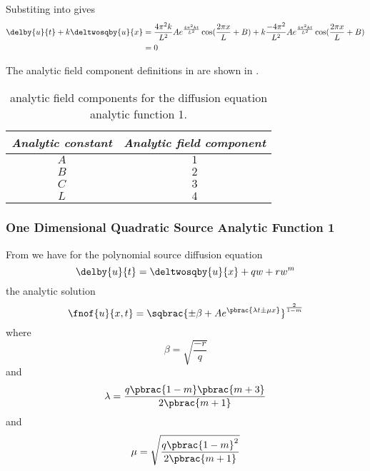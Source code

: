 Substiting  into  gives
\begin{align}
  \delby{u}{t}+k\deltwosqby{u}{x} &=
  \dfrac{4\pi^{2}k}{L^{2}}Ae^{\frac{4\pi^{2}kt}{L^{2}}}\cos(\frac{2\pi x}{L}
  + B) +
  k\dfrac{-4\pi^{2}}{L^{2}}Ae^{\frac{4\pi^{2}kt}{L^{2}}}\cos(\frac{2\pi x}{L}
  + B) \\
  &= 0
\end{align}

The analytic field component definitions in \OpenCMISS are shown in .

\begin{table}[htb] \centering
  \begin{tabular}{|c|c|} \hline
    \emph{Analytic constant} & \emph{Analytic field component} \\ \hline \hline
    $A$ & $1$ \\ 
    $B$ & $2$ \\
    $C$ & $3$ \\
    $L$ & $4$ \\ \hline
  \end{tabular}
  \caption{\OpenCMISS analytic field components for the \oned diffusion equation
    analytic function 1.}
  \label{tab:OpenCMISSAnalyticFieldDiffusionEquationOneDim1}
\end{table}

\subsubsection{One Dimensional Quadratic Source Analytic Function 1}

From  we have for
the \oned polynomial source diffusion equation
\begin{equation}
  \delby{u}{t}=\deltwosqby{u}{x}+qw+rw^{m}
\end{equation}
the analytic solution
\begin{equation}
  \fnof{u}{x,t}=\sqbrac{\pm\beta+Ae^{\pbrac{\lambda t \pm\mu x}}}^\frac{2}{1-m}
\end{equation}
where
\begin{equation}
  \beta=\sqrt{\dfrac{-r}{q}}
\end{equation}
and
\begin{equation}
  \lambda=\dfrac{q\pbrac{1-m}\pbrac{m+3}}{2\pbrac{m+1}}
\end{equation}
and 
\begin{equation}
  \mu=\sqrt{\dfrac{q\pbrac{1-m}^{2}}{2\pbrac{m+1}}}
\end{equation}

